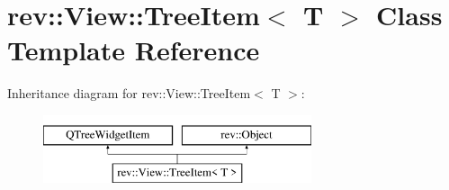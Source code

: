 \hypertarget{classrev_1_1_view_1_1_tree_item}{}\section{rev\+::View\+::Tree\+Item$<$ T $>$ Class Template Reference}
\label{classrev_1_1_view_1_1_tree_item}
Inheritance diagram for rev\+::View\+::Tree\+Item$<$ T $>$\+:\begin{figure}[H]
\begin{center}
\leavevmode
\includegraphics[height=2.000000cm]{classrev_1_1_view_1_1_tree_item}
\end{center}
\end{figure}
